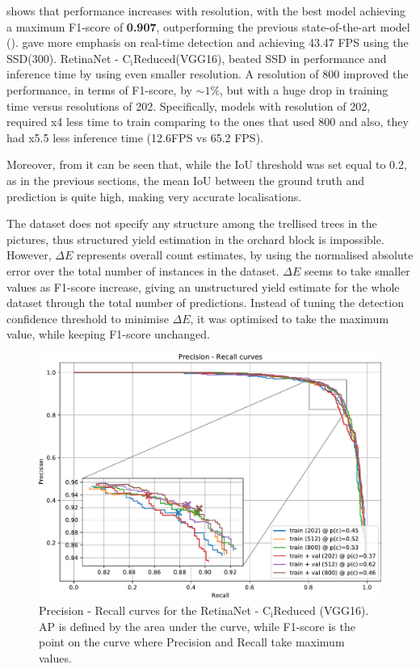  shows that performance increases with resolution, with the best model achieving a maximum F1-score of \textbf{0.907}, outperforming the previous state-of-the-art model (\cite{bargoti2017deep}). \cite{liang2018apple} gave more emphasis on real-time detection and achieving 43.47 FPS using the SSD(300). RetinaNet - $\text{C}_\text{i}\text{Reduced}$(VGG16), beated SSD in performance and inference time by using even smaller resolution. A resolution of 800 improved the performance, in terms of F1-score, by $\sim1\%$, but with a huge drop in training time versus resolutions of 202. Specifically, models with resolution of 202, required x4 less time to train comparing to the ones that used 800 and also, they had x5.5 less inference time (12.6FPS vs 65.2 FPS).

Moreover, from  it can be seen that, while the IoU threshold was set equal to 0.2, as in the previous sections, the mean IoU between the ground truth and prediction is quite high, making very accurate localisations.

The dataset does not specify any structure among the trellised trees in the pictures, thus structured yield estimation in the orchard block is impossible. However, $\Delta E$ represents overall count estimates, by using the normalised absolute error over the total number of instances in the dataset. $\Delta E$ seems to take smaller values as F1-score increase, giving an unstructured yield estimate for the whole dataset through the total number of predictions. Instead of tuning the detection confidence threshold to minimise $\Delta E$, it was optimised to take the maximum value, while keeping F1-score unchanged.

\begin{figure}[!htb]
  \centering
  \includegraphics[width=\textwidth]{figures/ch3/fig10.pdf}
  \caption{Precision - Recall curves for the RetinaNet - $\text{C}_\text{i}\text{Reduced}$ (VGG16). AP is defined by the area under the curve, while F1-score is the point on the curve where Precision and Recall take maximum values.}
  \label{fig10}
\end{figure} 


